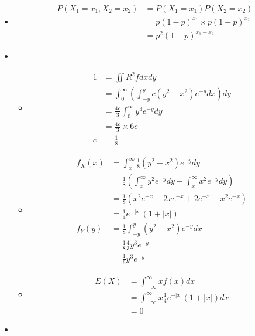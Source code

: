 \documentclass{article}
\begin{document}
\begin{itemize}
\begin{itemize}
\begin{align*}
\begin{matrix}
            \end{matrix}\right.
        \end{align*}
    \end{itemize}
    \item [6.7]
    \begin{align*}
        P(X_1=x_1,X_2=x_2)&=P(X_1=x_1)P(X_2=x_2)\\
        &=p(1-p)^{x_1}\times p(1-p)^{x_2}\\
        &=p^2(1-p)^{x_1+x_2}
    \end{align*}
    \item [6.8]
    \begin{itemize}
        \item [a)]
        \begin{align*}
            1&=\iint R^2 f dxdy\\
            &=\int_{0}^{\infty}(\int_{-y}^{y}c(y^2-x^2)e^{-y}dx)dy\\
            &=\frac{4c}{3}\int_{0}^{\infty} y^3e^{-y} dy\\
            &=\frac{4c}{3}\times 6c\\
            c&=\frac{1}{8}
        \end{align*}
        \item [b)]
        \begin{align*}
            f_X(x)&=\int_{x}^{\infty}\frac{1}{8}(y^2-x^2)e^{-y}dy\\
            &=\frac{1}{8}\left(\int_{x}^{\infty}y^2e^{-y}dy-\int_{x}^{\infty}x^2e^{-y}dy\right)\\
            &=\frac{1}{8}\left(x^2e^{-x}+2xe^{-x}+2e^{-x}-x^2e^{-x}\right)\\
            &=\frac{1}{4}e^{-|x|}(1+|x|)\\
            f_Y(y) &=\frac{1}{8}\int_{-y}^{y}(y^2-x^2)e^{-y} dx\\
            &=\frac{1}{8}\frac{4}{3}y^3e^{-y}\\
            &=\frac{1}{6}y^3e^{-y}
        \end{align*}
        \item[c)]
        \begin{align*}
            E(X) &= \int_{-\infty}^{\infty}x f(x) dx \\
            &=\int_{-\infty}^{\infty}x \frac{1}{4}e^{-|x|}(1+|x|)dx\\
            &=0
        \end{align*}
    \end{itemize}
    \item [6.9]

\end{itemize}
\end{document}
